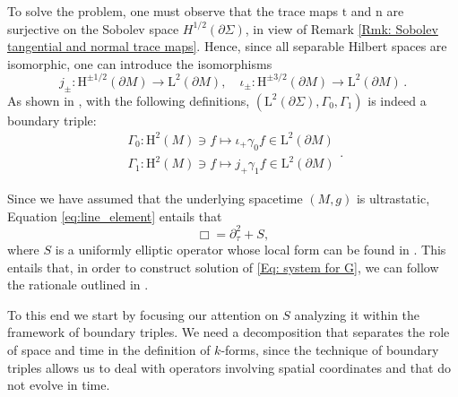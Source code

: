\begin{Example}
	To solve the problem, one must observe that the trace maps $\mathrm{t}$ and $\mathrm{n}$ are surjective on the Sobolev space $H^{1/2}(\partial \Sigma)$, in view of Remark \ref{Rmk: Sobolev tangential and normal trace maps}. Hence, since all separable Hilbert spaces are isomorphic, one can introduce the isomorphisms
	\begin{equation}
	j_{ \pm} : \mathrm{H}^{ \pm 1 / 2}(\partial M) \rightarrow \mathrm{L}^{2}(\partial M), \quad \iota_{ \pm} : \mathrm{H}^{ \pm 3 / 2}(\partial M) \rightarrow \mathrm{L}^{2}(\partial M)
\,.
	\end{equation}
	As shown in \cite[Prop. 24]{Dappiaggi-Drago-Ferreira-19}, with the following definitions, $(\mathrm{L}^2(\partial \Sigma),\Gamma_0,\Gamma_1)$ is indeed a boundary triple:
	\begin{equation}
	\begin{array}{l}{\Gamma_{0} : \mathrm{H}^{2}(M) \ni f \mapsto \iota_{+} \gamma_{0} f \in \mathrm{L}^{2}(\partial M)} \\ {\Gamma_{1} : \mathrm{H}^{2}(M) \ni f \mapsto j_{+} \gamma_{1} f \in \mathrm{L}^{2}(\partial M)}\end{array}
.
	\end{equation}
\end{Example}

Since we have assumed that the underlying spacetime $(M,g)$ is ultrastatic, Equation \eqref{eq:line_element} entails that \cite{Pfenning:2009nx} 
$$\Box=\partial_\tau^2+S,$$
where $S$ is a uniformly elliptic operator whose local form can be found in \cite{Pfenning:2009nx}. This entails that, in order to construct solution of \eqref{Eq: system for G}, we can follow the rationale outlined in \cite{Dappiaggi-Drago-Ferreira-19}. 

To this end we start by focusing our attention on $S$ analyzing it within the framework of boundary triples. We need a decomposition that separates the role of space and time in the definition of $k$-forms, since the technique of boundary triples allows us to deal with operators involving spatial coordinates and that do not evolve in time.\\


